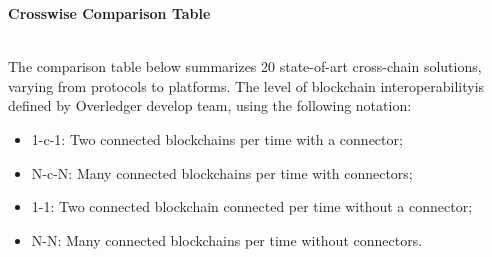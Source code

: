 \begin{huge}
\textbf{Crosswise Comparison Table}
\end{huge}
\\

\noindent The comparison table below summarizes 20 state-of-art cross-chain solutions, varying from protocols to platforms. The level of blockchain interoperability\footnotemark[1] is defined by Overledger develop team, using the following notation:
\begin{itemize}
    \item 1-c-1: Two connected blockchains per time with a connector;
    \item N-c-N: Many connected blockchains per time with connectors;
    \item 1-1: Two connected blockchain connected per time without a connector;
    \item N-N: Many connected blockchains per time without connectors.
\end{itemize}


 




